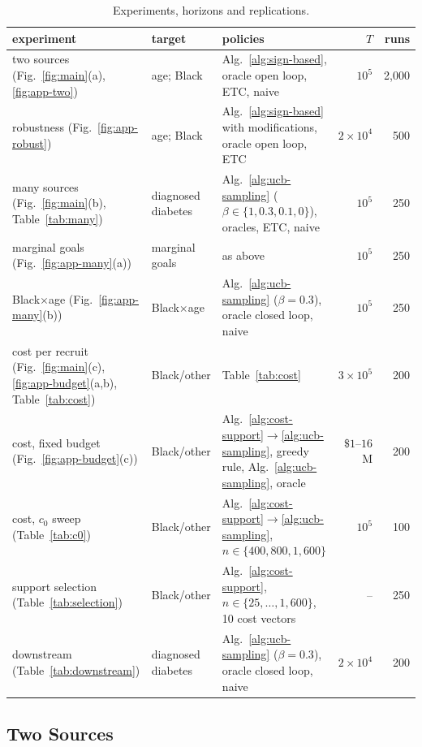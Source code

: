 \documentclass[twoside]{article}
\begin{document}
\begin{table}[!ht]
\caption{Experiments, horizons and replications.}
\label{tab:protocol}
\centering\small
\setlength{\tabcolsep}{3.5pt}
\begin{tabular}{lllrr}
\hline
experiment & target & policies & \(T\) & runs\\
\hline
two sources (Fig.~\ref{fig:main}(a), \ref{fig:app-two}) & age; Black & Alg.~\ref{alg:sign-based}, oracle open loop, ETC, naive & \(10^5\) & 2{,}000\\
robustness (Fig.~\ref{fig:app-robust}) & age; Black & Alg.~\ref{alg:sign-based} with modifications, oracle open loop, ETC & \(2\times10^4\) & 500\\
many sources (Fig.~\ref{fig:main}(b), Table~\ref{tab:many}) & diagnosed diabetes & Alg.~\ref{alg:ucb-sampling} (\(\beta\in\{1,0.3,0.1,0\}\)), oracles, ETC, naive & \(10^5\) & 250\\
marginal goals (Fig.~\ref{fig:app-many}(a)) & marginal goals & as above & \(10^5\) & 250\\
Black\(\times\)age (Fig.~\ref{fig:app-many}(b)) & Black\(\times\)age & Alg.~\ref{alg:ucb-sampling} (\(\beta=0.3\)), oracle closed loop, naive & \(10^5\) & 250\\
cost per recruit (Fig.~\ref{fig:main}(c), \ref{fig:app-budget}(a,b), Table~\ref{tab:cost}) & Black/other & Table~\ref{tab:cost} & \(3\times10^5\) & 200\\
cost, fixed budget (Fig.~\ref{fig:app-budget}(c)) & Black/other & Alg.~\ref{alg:cost-support}\(\to\)\ref{alg:ucb-sampling}, greedy rule, Alg.~\ref{alg:ucb-sampling}, oracle & \(\$1\)--\(16\)M & 200\\
cost, \(c_0\) sweep (Table~\ref{tab:c0}) & Black/other & Alg.~\ref{alg:cost-support}\(\to\)\ref{alg:ucb-sampling}, \(n\in\{400,800,1{,}600\}\) & \(10^5\) & 100\\
support selection (Table~\ref{tab:selection}) & Black/other & Alg.~\ref{alg:cost-support}, \(n\in\{25,\dots,1{,}600\}\), 10 cost vectors & -- & 250\\
downstream (Table~\ref{tab:downstream}) & diagnosed diabetes & Alg.~\ref{alg:ucb-sampling} (\(\beta=0.3\)), oracle closed loop, naive & \(2\times10^4\) & 200\\
\hline
\end{tabular}
\end{table}

\FloatBarrier
\subsection{Two Sources}
\label{app:exp-two}
\end{document}
